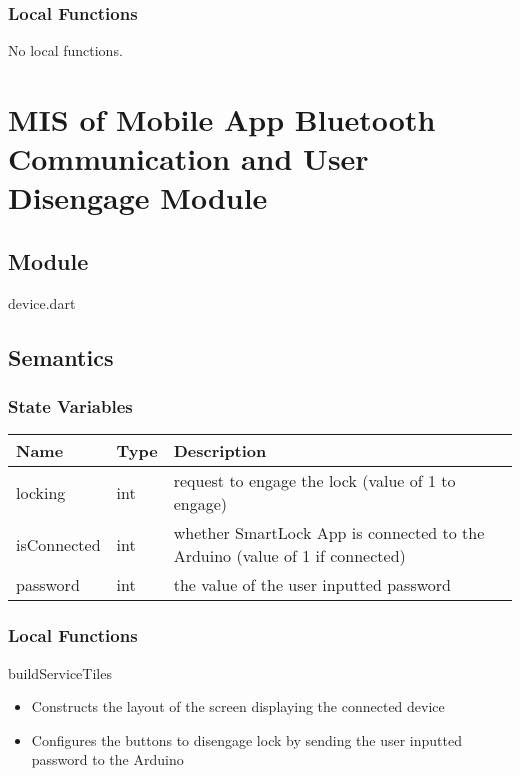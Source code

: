 \documentclass[12pt, titlepage]{article}
\begin{document}
\subsubsection{Local Functions}

No local functions.




\section{MIS of Mobile App Bluetooth Communication and User Disengage Module} \label{mHD}

\subsection{Module}
device.dart

\subsection{Semantics}

\subsubsection{State Variables}

\begin{center}
\begin{tabular}{p{4cm} p{4cm} p{6cm}}
\hline
\textbf{Name} & \textbf{Type} & \textbf{Description} \\
\hline
locking & int & request to engage the lock (value of 1 to engage) \\
isConnected & int & whether SmartLock App is connected to the Arduino (value of 1 if connected) \\
password & int & the value of the user inputted password \\
\hline
\end{tabular}
\end{center}

\subsubsection{Local Functions}

\noindent buildServiceTiles
\begin{itemize}
\item Constructs the layout of the screen displaying the connected device
\item Configures the buttons to disengage lock by sending the user inputted password to the Arduino 
\end{itemize}
\end{document}

